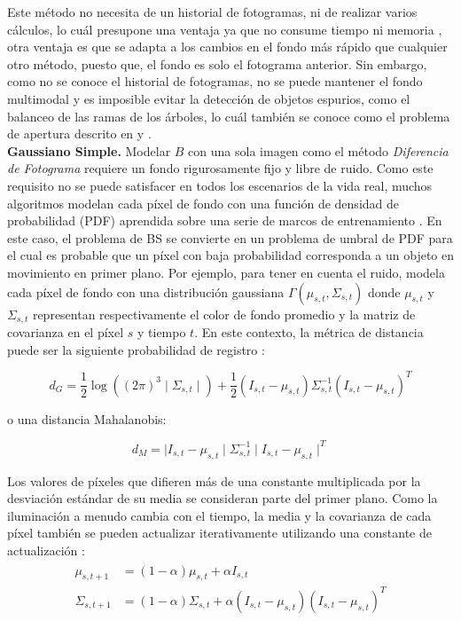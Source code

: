 Este método no necesita de un historial de fotogramas, ni de realizar varios cálculos, lo cuál presupone una ventaja ya que no consume tiempo ni memoria \cite{InsafSlimane}, otra ventaja es que se adapta a los cambios en el fondo más rápido que cualquier otro método, puesto que, el fondo es solo el fotograma anterior. Sin embargo, como no se conoce el historial de fotogramas, no se puede mantener el fondo multimodal y es imposible evitar la detección de objetos espurios, como el balanceo de las ramas de los árboles, lo cuál también se conoce como el problema de apertura descrito en \cite{ApewokinApewokinWillsWillsGentile} y \cite{KentaroJohnBarryBrian}.\\

\textbf{Gaussiano Simple.}
Modelar $B$ con una sola imagen como el método \textit{Diferencia de Fotograma} requiere un fondo rigurosamente fijo y libre de ruido. Como este requisito no se puede satisfacer en todos los escenarios de la vida real, muchos algoritmos modelan cada píxel de fondo con una función de densidad de probabilidad (PDF) aprendida sobre una serie de marcos de entrenamiento \cite{YannickPierreMarcBrunoHeleneChristophe}. En este caso, el problema de BS se convierte en un problema de umbral de PDF para el cual es probable que un píxel con baja probabilidad corresponda a un objeto en movimiento en primer plano. Por ejemplo, para tener en cuenta el ruido, \cite{WrenAzarbayejaniDarrellPentland} modela cada píxel de fondo con una distribución gaussiana $\Gamma(\mu_{s,t}, \Sigma_{s,t})$ donde  $\mu_{s,t}$ y $\Sigma_{s,t}$ representan respectivamente el color de fondo promedio y la matriz de covarianza en el píxel $s$ y tiempo $t$. En este contexto, la métrica de distancia puede ser la siguiente probabilidad de registro \cite{YannickPierreMarcBrunoHeleneChristophe}:

$$d_G = \frac{1}{2}\log((2\pi)^3\mid\Sigma_{s,t}\mid)+\frac{1}{2}(I_{s,t}-\mu_{s,t})\Sigma_{s,t}^{-1}(I_{s,t}-\mu_{s,t})^T$$

o una distancia Mahalanobis:

$$d_M = \mid I_{s,t}-\mu_{s,t}\mid\Sigma_{s,t}^{-1}\mid I_{s,t}-\mu_{s,t}\mid^T$$

Los valores de píxeles que difieren más de una constante multiplicada por la desviación estándar de su media se consideran parte del primer plano. Como la iluminación a menudo cambia con el tiempo, la media y la covarianza de cada píxel también se pueden actualizar iterativamente utilizando una constante de actualización \cite{YannickPierreMarcBrunoHeleneChristophe}:
\begin{gather*}
    \begin{split}
        \mu_{s,t+1} & = (1-\alpha)\mu_{s,t}+\alpha I_{s,t}\\
        \Sigma_{s,t+1} & = (1-\alpha)\Sigma_{s,t}+\alpha(I_{s,t}-\mu_{s,t})(I_{s,t}-\mu_{s,t})^T
    \end{split}
\end{gather*}

